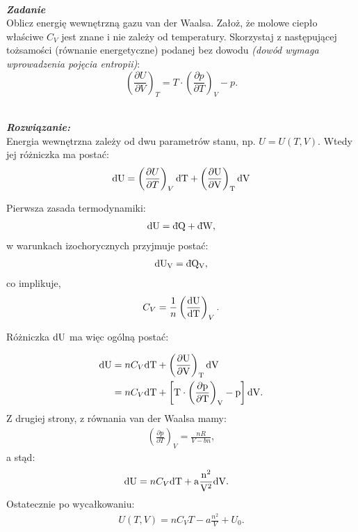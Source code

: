 \documentclass[11pt,a4paper]{article}
\newcounter{zadanie}\newcommand{\zadanie}[1][]{\addtocounter{zadanie}{1} ~\\  {\bf \emph{Zadanie \arabic{zadanie} #1 }} \\}
\newcounter{wskazowka}\newcommand{\wskazowka}[1][]{\addtocounter{wskazowka}{1} ~\\  {\bf \emph{Wskazówka \arabic{wskazowka} #1 }} \\}
\newcounter{rozwiazanie}\newcommand{\rozwiazanie}[1][]{\addtocounter{rozwiazanie}{1} ~\\  {\bf \emph{Rozwiązanie: }} \\}
\newcommand{\dbar}{{\mkern3mu\mathchar'26\mkern-12mu d}}
\begin{document}
\newpage
\zadanie
Oblicz energię wewnętrzną gazu van der Waalsa.
Założ, że molowe ciepło właściwe $C_V$ jest znane i nie zależy od temperatury.
Skorzystaj z następującej tożsamości (równanie energetyczne)
podanej bez dowodu {\em (dowód wymaga wprowadzenia pojęcia entropii)}:
\[ \left(\frac{\partial U}{\partial V}\right)_T = 
   T \cdot \left(\frac{\partial p}{\partial T}\right)_V - p.\]
\rozwiazanie 
Energia wewnętrzna zależy od dwu parametrów stanu, np. $U = U(T, V)$. Wtedy jej różniczka ma postać:
\begin{align}
  \rm{d} U &= \left(\frac{\partial U}{\partial T} \right)_V \rm{d}T  + \left(\frac{\partial U}{\partial V} \right)_T \rm{d}V \\
\end{align}

Pierwsza zasada termodynamiki:
\begin{align}
\rm{d}U = \rm{\dbar}Q + \rm{\dbar}W,
\end{align}
w warunkach izochorycznych przyjmuje postać:
\begin{align}
\rm{d}U_V = \rm{\dbar}Q _V, 
\end{align}
co implikuje,
\begin{align}
C_V = \frac{1}{n}\left( \frac{\rm{d}U}{\rm{d}T}\right)_V.
\end{align}

Różniczka $\rm{d}U$ ma więc ogólną postać:

\begin{align}
  \rm{d} U &= n C_V \rm{d}T + \left(\frac{\partial U}{\partial V} \right)_T \rm{d}V \\
 &= n C_V \rm{d}T + \left[    T \cdot \left(\frac{\partial p}{\partial T}\right)_V - p\right] \rm{d}V.
\end{align}
 Z drugiej strony, z równania van der Waalsa mamy:
 \begin{align}
 \left( \frac{\partial p}{\partial T} \right)_V = \frac{nR}{V - bn},
 \end{align}
 a stąd: 
 \begin{align}
  \rm{d} U &=  n C_V \rm{d} T + a \frac{n^2}{V^2} \rm{d}V.
 \end{align}
 Ostatecznie po wycałkowaniu:
 \begin{align}
 U(T, V) = n C_V T - a \frac{n^2}{V}  + U_0.
 \end{align}
\end{document}
